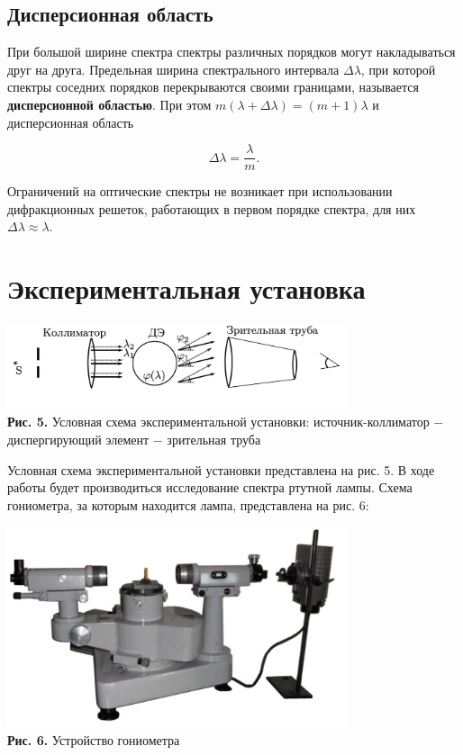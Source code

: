 \documentclass[a4paper,12pt]{article} %
\begin{document}
\subsection{Дисперсионная область}
\hfill \break При большой ширине спектра спектры различных порядков могут накладываться друг на друга. Предельная ширина спектрального интервала $\Delta \lambda$, при которой спектры соседних порядков перекрываются своими границами, называется \textbf{дисперсионной областью}. При этом $m(\lambda + \Delta \lambda) = (m + 1)\lambda$ и дисперсионная область

\begin{equation}\label{ linkname }
\Delta \lambda = \frac{\lambda}{m}.
\end{equation}

\hfill \break Ограничений на оптические спектры не возникает при использовании дифракционных решеток, работающих в первом порядке спектра, для них $\Delta \lambda \approx \lambda$.

\section{Экспериментальная установка}

\begin{center}
\includegraphics[width=0.75\textwidth]{4.4.1_4.png}\\
\textbf{Рис. 5.}  Условная схема экспериментальной установки: источник-коллиматор $-$ диспергирующий элемент $-$ зрительная труба\\ 
\end{center}

\hfill \break Условная схема экспериментальной установки представлена на рис. 5. В ходе работы будет производиться исследование спектра ртутной лампы. Схема гониометра, за которым находится лампа, представлена на рис. 6:

\begin{center}
\includegraphics[width=0.75\textwidth]{4.4.1_5.png}\\
\textbf{Рис. 6.}  Устройство гониометра\\ 
\end{center}
\end{document}
